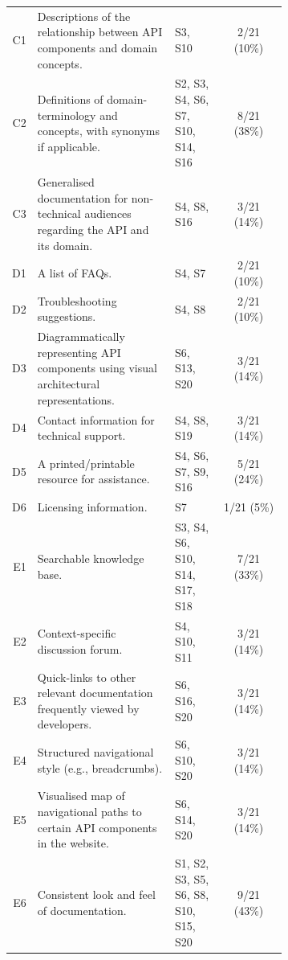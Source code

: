 \begin{small}
\begin{longtable}{rp{0.5\linewidth}|p{0.175\linewidth}|c}
  \midrule
  C1&
  Descriptions of the relationship between API components and domain concepts.
  &
  S3, S10 &
  2/21 (10\%)\\

  C2&
  Definitions of domain-terminology and concepts, with synonyms if applicable.
  &
  S2, S3, S4, S6, S7, S10, S14, S16 &
  8/21 (38\%)\\

  C3&
  Generalised documentation for non-technical audiences regarding the API and its domain.
  &
  S4, S8, S16 &
  3/21 (14\%)\\

  \midrule
  D1&
  A list of FAQs.
  &
  S4, S7 &
  2/21 (10\%)\\

  D2&
  Troubleshooting suggestions.
  &
  S4, S8 &
  2/21 (10\%)\\

  D3&
  Diagrammatically representing API components using visual architectural representations.
  &
  S6, S13, S20 &
  3/21 (14\%)\\

  D4&
  Contact information for technical support.
  &
  S4, S8, S19 &
  3/21 (14\%)\\

  D5&
  A printed/printable resource for assistance.
  &
  S4, S6, S7, S9, S16 &
  5/21 (24\%)\\

  D6&
  Licensing information.
  &
  S7 &
  1/21 (5\%)\\

  \midrule
  E1&
  Searchable knowledge base.
  &
  S3, S4, S6, S10, S14, S17, S18 &
  7/21 (33\%)\\

  E2&
  Context-specific discussion forum.
  &
  S4, S10, S11 &
  3/21 (14\%)\\

  E3&
  Quick-links to other relevant documentation frequently viewed by developers.
  &
  S6, S16, S20 &
  3/21 (14\%)\\

  E4&
  Structured navigational style (e.g., breadcrumbs).
  &
  S6, S10, S20 &
  3/21 (14\%)\\

  E5&
  Visualised map of navigational paths to certain API components in the website.
  &
  S6, S14, S20 &
  3/21 (14\%)\\

  {E6}&
  {Consistent look and feel of documentation.}
  &
  {S1, S2, S3, S5, S6, S8, S10, S15, S20} &
  {9/21 (43\%)}\\
\end{longtable}
\end{small}